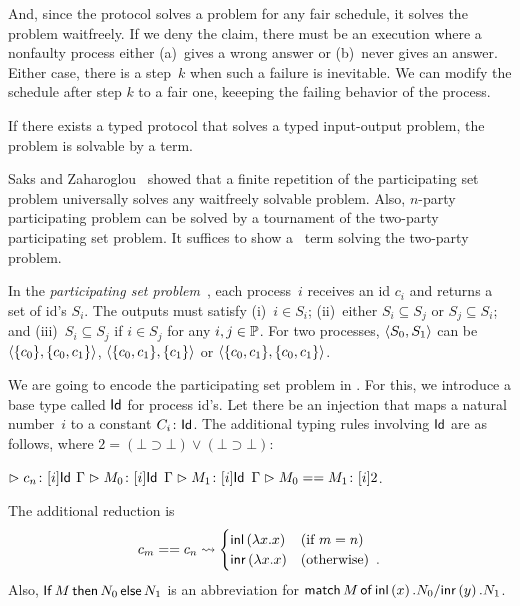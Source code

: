 And, since the protocol solves a problem for any fair schedule, it 
solves the problem waitfreely.
If we deny the claim, there must be an execution where a nonfaulty
process
either (a)~gives a
wrong answer or
 (b)~never gives an answer.
 Either case, there is a step~$k$ when
 such a failure is inevitable.
We can modify the schedule after step $k$ to a fair one,
keeeping the failing behavior of
the process.

\begin{theorem}[Completeness]
If there exists a typed protocol that solves a typed input-output
 problem, 
the problem is solvable by a term.
\end{theorem}

Saks and Zaharoglou~\cite{Saks:1993vq} showed that a finite repetition of the participating set
problem universally solves any waitfreely solvable problem.
Also, $n$-party participating problem can be solved by a tournament of
the two-party participating set problem.
It suffices to show a \lgd\, term solving the two-party problem.


In the \textit{participating set problem}~\cite{borowsky},
each process~$i$ receives an id $c_i$ and
returns a set of id's $S_i$.
The outputs must satisfy (i)~$i\in S_i$; (ii)~either $S_i\subseteq S_j$
or $S_j\subseteq S_i$; and (iii)~$S_i\subseteq S_j$  if $i\in S_j$ for any
$i,j\in\mathbb{P}$.
For two processes,
$\langle{S_0, S_1}\rangle$ can be $\langle{\{c_0\}, \{c_0, c_1\}}\rangle$, $\langle{\{c_0, c_1\}, \{c_1\}}\rangle$
or
$\langle{\{c_0, c_1\}, \{c_0, c_1\}}\rangle$.

We are going to encode the participating set problem in \lgd.
For this, we introduce a base type called $\mathsf{Id}$ for process id's.
Let there be an injection that maps a natural number~$i$ to a constant
$C_i\colon\mathsf{Id}$.
The additional typing rules involving $\mathsf{Id}$ are as follows, where $2 = (\bot\supset\bot)\vee(\bot\supset\bot)$:
\begin{center}
 \UnaryRule{}{}
 {$\vartriangleright {c_n} \colon{[i]\mathsf{Id}}$}
 \hfill
 \BinaryRule
 {$\Gamma\vartriangleright {M_0} \colon{[}i]\mathsf{Id}$}
 {$\Gamma\vartriangleright {M_1} \colon{[}i]\mathsf{Id}$}
 {}
 {$\Gamma \vartriangleright {{M_0} == {M_1}} \colon{[i]2}$}\enspace.
\end{center}
The additional reduction is
\[
 c_m == c_n \rightsquigarrow 
\begin{cases}
 \mathsf{inl}\left({\lambda x.x}\right)& (\text{if } m = n)\\
 \mathsf{inr}\left({\lambda x.x}\right)& (\text{otherwise})\enspace.
\end{cases}
\]
Also, 
${\mathsf{If}\, {M}\, \mathsf{then}\, {N_0}\, \mathsf{else}\, {N_1}}$
is an abbreviation for
${\mathsf{match}\,{M}\,\mathsf{of}\, \mathsf{inl}\left({x}\right). {N_0}/ \mathsf{inr}\left({y}\right). {N_1}}$.

